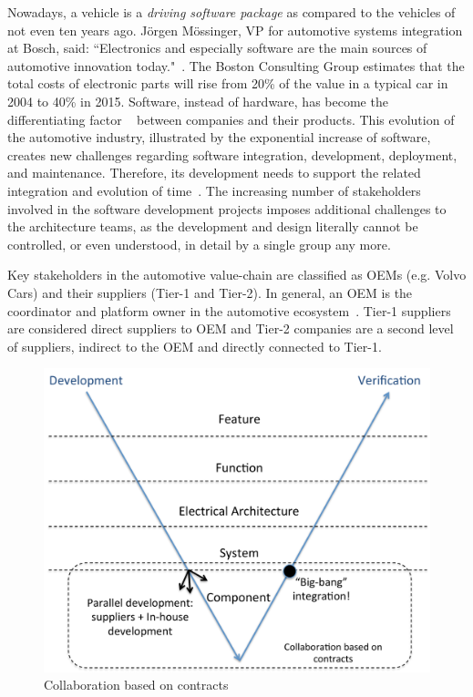 Nowadays, a vehicle is a {\em driving software package} as compared to the vehicles of not even ten years ago. J\"orgen M\"ossinger, VP for automotive systems integration at Bosch, said: ``Electronics and especially software are the main sources of automotive innovation today."~\cite{Mossinger2010SoftwareAutomotive}. The Boston Consulting Group estimates that the total costs of electronic parts will rise from 20\% of the value in a typical car in 2004 to 40\% in 2015. Software, instead of hardware, has become the differentiating factor%
~\cite{ConnectedVehicle2012,hbr2015hardwaresoftware,Mossinger2010SoftwareAutomotive,Broy:2006:CAS:1134285.1134292} %
between companies and their products. This evolution of the automotive industry, illustrated by the exponential increase of software, creates new challenges regarding software integration, development, deployment, and maintenance. Therefore, its development needs to support the related integration and evolution of time~\cite{Broy:2006:CAS:1134285.1134292,qualman2009socialnomics,JansenTale2009}. The increasing number of stakeholders involved in the software development projects imposes additional challenges to the architecture teams, as the development and design literally cannot be controlled, or even understood, in detail by a single group any more. 

{Key} stakeholders in the automotive %
value-chain %
are classified as OEMs (e.g. Volvo Cars) and their suppliers (Tier-1 and Tier-2). In general, an OEM is the coordinator and platform owner in the automotive ecosystem~\cite{KS15}. Tier-1 suppliers are considered direct suppliers to OEM and Tier-2 companies are a second level of suppliers, indirect to the OEM and directly connected to Tier-1. %

\begin{figure}[htb]
\vspace{-.2cm}
\centering
\includegraphics[width=.9\columnwidth]{figure/Closed-contract-collaboration.pdf}
\vspace{-.2cm}
\caption{Collaboration based on contracts}
\label{fig:closedContractCollaboration}
\vspace{-.2cm}
\end{figure}

